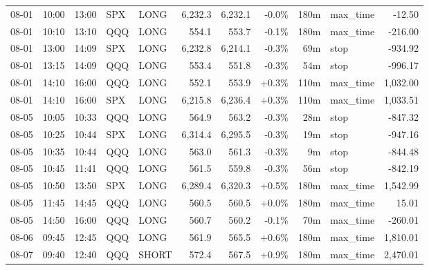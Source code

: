 \documentclass[11pt,a4paper,twoside]{article}
\begin{document}
\begin{center}
\begin{longtable}{>{\color{txtmain}}l l l l l r r r r >{\color{txtmain}}l r}
08-01 & 10:00 & 13:00 & SPX & LONG & 6,232.3 & 6,232.1 & \textcolor{lossred}{-0.0\%} & 180m & max\_time & \textcolor{lossred}{-12.50} \\
08-01 & 10:10 & 13:10 & QQQ & LONG & 554.1 & 553.7 & \textcolor{lossred}{-0.1\%} & 180m & max\_time & \textcolor{lossred}{-216.00} \\
08-01 & 13:00 & 14:09 & SPX & LONG & 6,232.8 & 6,214.1 & \textcolor{lossred}{-0.3\%} & 69m & stop & \textcolor{lossred}{-934.92} \\
08-01 & 13:15 & 14:09 & QQQ & LONG & 553.4 & 551.8 & \textcolor{lossred}{-0.3\%} & 54m & stop & \textcolor{lossred}{-996.17} \\
08-01 & 14:10 & 16:00 & QQQ & LONG & 552.1 & 553.9 & \textcolor{wingreen}{+0.3\%} & 110m & max\_time & \textcolor{wingreen}{1,032.00} \\
08-01 & 14:10 & 16:00 & SPX & LONG & 6,215.8 & 6,236.4 & \textcolor{wingreen}{+0.3\%} & 110m & max\_time & \textcolor{wingreen}{1,033.51} \\
08-05 & 10:05 & 10:33 & QQQ & LONG & 564.9 & 563.2 & \textcolor{lossred}{-0.3\%} & 28m & stop & \textcolor{lossred}{-847.32} \\
08-05 & 10:25 & 10:44 & SPX & LONG & 6,314.4 & 6,295.5 & \textcolor{lossred}{-0.3\%} & 19m & stop & \textcolor{lossred}{-947.16} \\
08-05 & 10:35 & 10:44 & QQQ & LONG & 563.0 & 561.3 & \textcolor{lossred}{-0.3\%} & 9m & stop & \textcolor{lossred}{-844.48} \\
08-05 & 10:45 & 11:41 & QQQ & LONG & 561.5 & 559.8 & \textcolor{lossred}{-0.3\%} & 56m & stop & \textcolor{lossred}{-842.19} \\
08-05 & 10:50 & 13:50 & SPX & LONG & 6,289.4 & 6,320.3 & \textcolor{wingreen}{+0.5\%} & 180m & max\_time & \textcolor{wingreen}{1,542.99} \\
08-05 & 11:45 & 14:45 & QQQ & LONG & 560.5 & 560.5 & \textcolor{wingreen}{+0.0\%} & 180m & max\_time & \textcolor{wingreen}{15.01} \\
08-05 & 14:50 & 16:00 & QQQ & LONG & 560.7 & 560.2 & \textcolor{lossred}{-0.1\%} & 70m & max\_time & \textcolor{lossred}{-260.01} \\
08-06 & 09:45 & 12:45 & QQQ & LONG & 561.9 & 565.5 & \textcolor{wingreen}{+0.6\%} & 180m & max\_time & \textcolor{wingreen}{1,810.01} \\
08-07 & 09:40 & 12:40 & QQQ & SHORT & 572.4 & 567.5 & \textcolor{wingreen}{+0.9\%} & 180m & max\_time & \textcolor{wingreen}{2,470.01} \\

\end{longtable}
\end{center}
\end{document}
